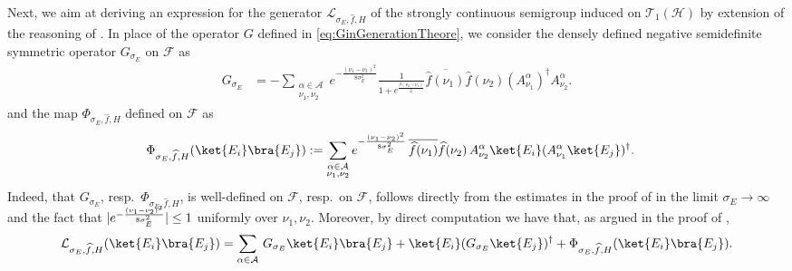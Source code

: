 \documentclass[11pt]{amsart}
\newcommand{\1}{\mathbbm{1}}
\newcommand{\cH}{\mathcal{H}}
\newcommand{\cL}{\mathcal{L}}
\theoremstyle{plain}
\theoremstyle{definition}
\theoremstyle{remark}
\numberwithin{equation}{section}
\begin{document}
\noindent Next, we aim at deriving an expression for the generator $\cL_{\sigma_E,\widehat{f},H}$ of the strongly continuous semigroup induced on $\mathscr{T}_1(\cH)$ by extension of the reasoning of . In place of the operator $G$ defined in \eqref{eq:GinGenerationTheore}, we consider the densely defined negative semidefinite symmetric operator $G_{\sigma_E}$ on $\mathcal{F}$ as
\begin{align}\label{GsigmaEdeffirst}
 G_{\sigma_E}
&=-\sum_{\substack{\alpha\in\mathcal{A}\\ \nu_1,\nu_2}}\!e^{-\frac{(\nu_1-\nu_2)^2}{8\sigma_E^2}}\!\!\! \frac{1}{1+e^{\frac{\beta(\nu_2-\nu_1)}{2}}}\overline{\widehat{f}(\nu_1)}\widehat{f}(\nu_2)(A^\alpha_{\nu_1})^\dagger A^\alpha_{\nu_2}.
\end{align}
and the map $\Phi_{\sigma_E,\widehat{f},H}$ defined on $\mathscr{F}$ as
\begin{align*}
\Phi_{\sigma_E,\widehat{f},H}(\ket{E_i}\bra{E_j})&:=\sum_{\substack{\alpha\in\mathcal{A}\\ \nu_1,\nu_2}}e^{-\frac{(\nu_1-\nu_2)^2}{8\sigma_E^2}}\, \overline{\widehat{f}(\nu_1)}\widehat{f}(\nu_2)\, A^\alpha_{\nu_2} \ket{E_i} (A^\alpha_{\nu_1}\ket{E_j})^\dagger.
\end{align*}
\noindent Indeed, that $G_{\sigma_E}$, resp.~$\Phi_{\sigma_E,\widehat{f},H}$, is well-defined on $\mathcal{F}$, resp.~on $\mathscr{F}$, follows directly from the estimates in the proof of  in the limit $\sigma_E\to \infty$ and the fact that $|e^{\smash{-\frac{(\nu_1-\nu_2)^2}{8\sigma_E^2}}}|\le 1$ uniformly over $\nu_1,\nu_2$. Moreover, by direct computation we have that, as argued in the proof of , 
\begin{align*}
\cL_{\sigma_E,\widehat{f},H}(\ket{E_i}\bra{E_j})=\sum_{\alpha\in\mathcal{A}}\, G_{\sigma_E}\ket{E_i}\bra{E_j}+\ket{E_i}(G_{\sigma_E}\ket{E_j})^\dagger +\Phi_{\sigma_E,\widehat{f},H}(\ket{E_i}\bra{E_j}).
\end{align*}
\end{document}
